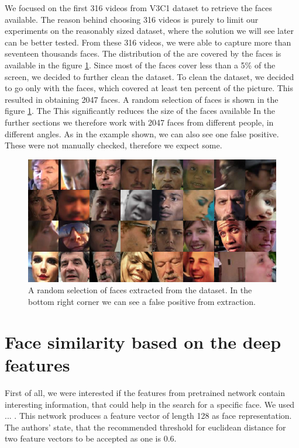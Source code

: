 We focused on the first 316 videos from V3C1 dataset to retrieve the faces available. The reason behind choosing 316 videos is purely to limit our experiments on the reasonably sized dataset, where the solution we will see later can be better tested. From these 316 videos, we were able to capture more than seventeen thousands faces. The distribution of the are covered by the faces is available in the figure \ref{}. Since most of the faces cover less than a 5\% of the screen, we decided to further clean the dataset.  To clean the dataset, we decided to go only with the faces, which covered at least ten percent of the picture. This resulted in obtaining 2047 faces. A random selection of faces is shown in the figure \ref{fig:random_selection_faces}. The This significantly reduces the size of the faces available
In the further sections we therefore work with 2047 faces from different people, in different angles. As in the example shown, we can also see one false positive. These were not manually checked, therefore we expect some.

\begin{figure}
    \centering
    \includegraphics[width=0.98\linewidth]{img/random_sample_faces.png}
    \caption{A random selection of faces extracted from the dataset. In the bottom right corner we can see a false positive from extraction.}
    \label{fig:random_selection_faces}
\end{figure}

\section{Face similarity based on the deep features}

First of all, we were interested if the features from pretrained network contain interesting information, that could help in the search for a specific face. We used ... . This network produces a feature vector of length 128 as face representation. The authors' state, that the recommended threshold for euclidean distance for two feature vectors to be accepted as one is 0.6.


